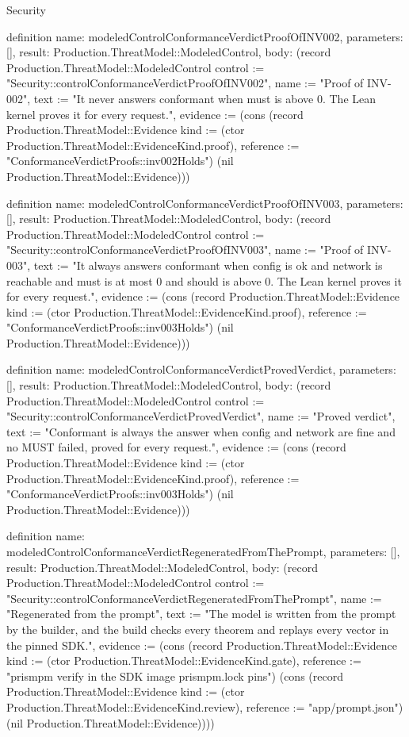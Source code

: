 \begin{lexlean}{Security}
\begin{semanticmodule}
definition{
  name: modeledControlConformanceVerdictProofOfINV002,
  parameters: [],
  result: Production.ThreatModel::ModeledControl,
  body: (record Production.ThreatModel::ModeledControl {control := "Security::controlConformanceVerdictProofOfINV002", name := "Proof of INV-002", text := "It never answers conformant when must is above 0. The Lean kernel proves it for every request.", evidence := (cons (record Production.ThreatModel::Evidence {kind := (ctor Production.ThreatModel::EvidenceKind.proof), reference := "ConformanceVerdictProofs::inv002Holds"}) (nil Production.ThreatModel::Evidence))})
}

definition{
  name: modeledControlConformanceVerdictProofOfINV003,
  parameters: [],
  result: Production.ThreatModel::ModeledControl,
  body: (record Production.ThreatModel::ModeledControl {control := "Security::controlConformanceVerdictProofOfINV003", name := "Proof of INV-003", text := "It always answers conformant when config is ok and network is reachable and must is at most 0 and should is above 0. The Lean kernel proves it for every request.", evidence := (cons (record Production.ThreatModel::Evidence {kind := (ctor Production.ThreatModel::EvidenceKind.proof), reference := "ConformanceVerdictProofs::inv003Holds"}) (nil Production.ThreatModel::Evidence))})
}

definition{
  name: modeledControlConformanceVerdictProvedVerdict,
  parameters: [],
  result: Production.ThreatModel::ModeledControl,
  body: (record Production.ThreatModel::ModeledControl {control := "Security::controlConformanceVerdictProvedVerdict", name := "Proved verdict", text := "Conformant is always the answer when config and network are fine and no MUST failed, proved for every request.", evidence := (cons (record Production.ThreatModel::Evidence {kind := (ctor Production.ThreatModel::EvidenceKind.proof), reference := "ConformanceVerdictProofs::inv003Holds"}) (nil Production.ThreatModel::Evidence))})
}

definition{
  name: modeledControlConformanceVerdictRegeneratedFromThePrompt,
  parameters: [],
  result: Production.ThreatModel::ModeledControl,
  body: (record Production.ThreatModel::ModeledControl {control := "Security::controlConformanceVerdictRegeneratedFromThePrompt", name := "Regenerated from the prompt", text := "The model is written from the prompt by the builder, and the build checks every theorem and replays every vector in the pinned SDK.", evidence := (cons (record Production.ThreatModel::Evidence {kind := (ctor Production.ThreatModel::EvidenceKind.gate), reference := "prismpm verify in the SDK image prismpm.lock pins"}) (cons (record Production.ThreatModel::Evidence {kind := (ctor Production.ThreatModel::EvidenceKind.review), reference := "app/prompt.json"}) (nil Production.ThreatModel::Evidence)))})
}


\end{semanticmodule}
\end{lexlean}

